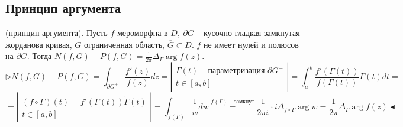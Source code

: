 \subsection{Принцип аргумента}
 (принцип аргумента). Пусть $f$ мероморфна в $D, \ \partial G$ -- кусочно-гладкая замкнутая жорданова кривая, $G$ ограниченная область, $\overline{G} \subset D.$ $f$ не имеет нулей и полюсов на $\partial G$. Тогда $N(f, G) - P(f, G) = \frac{1}{2\pi } \Delta_\Gamma \arg f(z).$
\[\triangleright N(f, G) - P(f, G) = \int_{\partial G^+} \frac{f'(z)}{f(z)} dz = \left|\begin{array}{ll}
    \Gamma(t) \text{ -- параметризация } \partial G^+ \\
    t \in [a, b]
\end{array}\right| = \int_a^b \frac{f'(\Gamma(t))}{f(\Gamma(t))} \dot{\Gamma(t)}dt =\] 
\[=\left|\begin{array}{ll}
    \dot{(f\circ \Gamma)}(t) = f'(\Gamma(t)) \dot{\Gamma}(t) \\
    t \in [a, b]
\end{array}\right| = \int_{f(\Gamma)} \frac{1}{w} dw \overset{f(\Gamma)\text{ -- замкнут}}{=} \frac{1}{2\pi i} \cdot i \Delta_{f\circ \Gamma} \arg w = \frac{1}{2\pi} \Delta_\Gamma \arg f(z) \blacktriangleleft\]